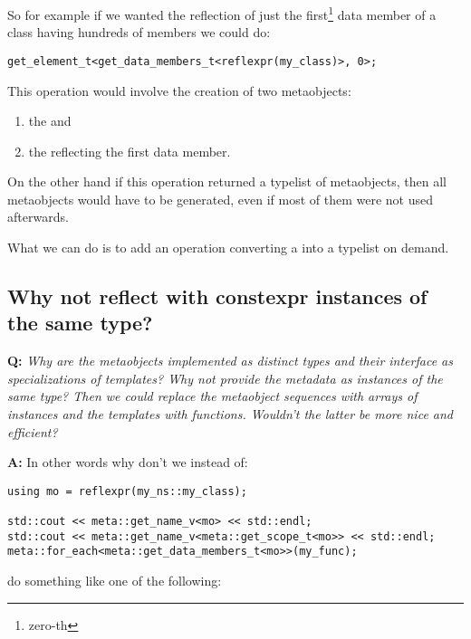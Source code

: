 So for example if we wanted the reflection of just the first\footnote
{zero-th} data member of a class having hundreds of members we could do:

\begin{verbatim}
get_element_t<get_data_members_t<reflexpr(my_class)>, 0>;
\end{verbatim}

This operation would involve the creation of two metaobjects:
\begin{enumerate}
	\item the  and
	\item the  reflecting the first data member.
\end{enumerate}

On the other hand if this operation returned a typelist of metaobjects,
then all metaobjects would have to be generated, even if most of them
were not used afterwards.

What we can do is to add an operation converting a 
into a typelist on demand.

\subsection{Why not reflect with constexpr instances of the same type?}

\textbf{Q:} {\em Why are the metaobjects implemented as distinct types and
their interface as specializations of templates? Why not provide the metadata
as \verb@constexpr@ instances of the same type? Then we could replace the metaobject
sequences with arrays of \verb@constexpr@ instances and the templates with
\verb@constexpr@ functions. Wouldn't the latter be more nice and efficient?}

\textbf{A:}
In other words why don't we instead of:

\begin{verbatim}
using mo = reflexpr(my_ns::my_class);

std::cout << meta::get_name_v<mo> << std::endl;
std::cout << meta::get_name_v<meta::get_scope_t<mo>> << std::endl;
meta::for_each<meta::get_data_members_t<mo>>(my_func);
\end{verbatim}

do something like one of the following:

